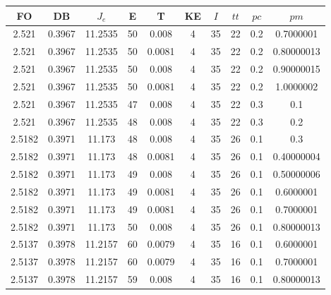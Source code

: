 \begin{table}[h!]
    \footnotesize
    \begin{center}
        \begin{tabular}{|c|c|c|c|c|c|c|c|c|c|}
        \hline
            {\bf FO} & {\bf DB} & $J_e$ & {\bf E} & {\bf T} & {\bf KE} & $I$ & $tt$ & $pc$ & $pm$ \\
        \hline
        \hline
            2.521 & 0.3967  & 11.2535 & 50 & 0.008 & 4 & 35 & 22 & 0.2 & 0.7000001\\
        \hline
        \hline
            2.521 & 0.3967  & 11.2535 & 50 & 0.0081 & 4 & 35 & 22 & 0.2 & 0.80000013\\
        \hline
        \hline
            2.521 & 0.3967  & 11.2535 & 50 & 0.008 & 4 & 35 & 22 & 0.2 & 0.90000015\\
        \hline
        \hline
            2.521 & 0.3967  & 11.2535 & 50 & 0.0081 & 4 & 35 & 22 & 0.2 & 1.0000002\\
        \hline
        \hline
            2.521 & 0.3967  & 11.2535 & 47 & 0.008 & 4 & 35 & 22 & 0.3 & 0.1\\
        \hline
        \hline
            2.521 & 0.3967  & 11.2535 & 48 & 0.008 & 4 & 35 & 22 & 0.3 & 0.2\\
        \hline
        \hline
            2.5182 & 0.3971  & 11.173 & 48 & 0.008 & 4 & 35 & 26 & 0.1 & 0.3\\
        \hline
        \hline
            2.5182 & 0.3971  & 11.173 & 48 & 0.0081 & 4 & 35 & 26 & 0.1 & 0.40000004\\
        \hline
        \hline
            2.5182 & 0.3971  & 11.173 & 49 & 0.008 & 4 & 35 & 26 & 0.1 & 0.50000006\\
        \hline
        \hline
            2.5182 & 0.3971  & 11.173 & 49 & 0.0081 & 4 & 35 & 26 & 0.1 & 0.6000001\\
        \hline
        \hline
            2.5182 & 0.3971  & 11.173 & 49 & 0.0081 & 4 & 35 & 26 & 0.1 & 0.7000001\\
        \hline
        \hline
            2.5182 & 0.3971  & 11.173 & 50 & 0.008 & 4 & 35 & 26 & 0.1 & 0.80000013\\
        \hline
        \hline
            2.5137 & 0.3978  & 11.2157 & 60 & 0.0079 & 4 & 35 & 16 & 0.1 & 0.6000001\\
        \hline
        \hline
            2.5137 & 0.3978  & 11.2157 & 60 & 0.0079 & 4 & 35 & 16 & 0.1 & 0.7000001\\
        \hline
        \hline
            2.5137 & 0.3978  & 11.2157 & 59 & 0.008 & 4 & 35 & 16 & 0.1 & 0.80000013\\

\end{tabular}
\end{center}
\end{table}
